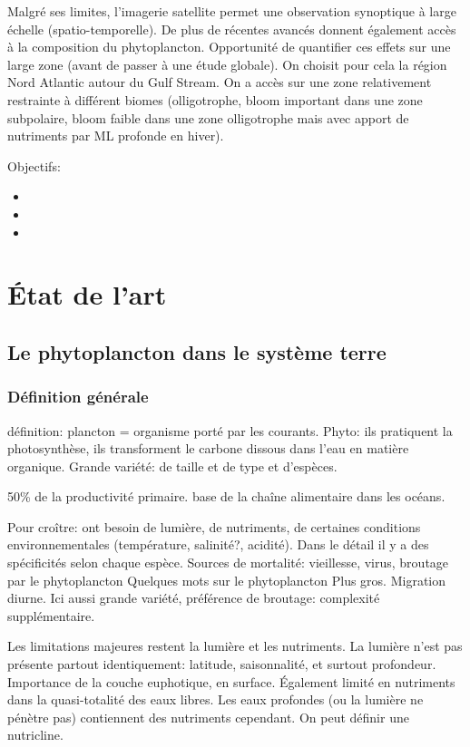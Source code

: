 Malgré ses limites, l'imagerie satellite permet une observation synoptique à large échelle (spatio-temporelle).
De plus de récentes avancés donnent également accès à la composition du phytoplancton.
Opportunité de quantifier ces effets sur une large zone (avant de passer à une étude globale).
On choisit pour cela la région Nord Atlantic autour du Gulf Stream. On a accès sur une zone relativement restrainte à différent biomes (olligotrophe, bloom important dans une zone subpolaire, bloom faible dans une zone olligotrophe mais avec apport de nutriments par ML profonde en hiver).

Objectifs:
\begin{itemize}
  \item
  \item
  \item
\end{itemize}


\section{État de l'art}
\label{sec:etat-de-lart}

\subsection{Le phytoplancton dans le système terre}
\label{sec:phyto-ds-sys-terre}

\subsubsection{Définition générale}
\label{sec:phyto-def-gen}

définition: plancton = organisme porté par les courants.
Phyto: ils pratiquent la photosynthèse, ils transforment le carbone dissous dans l'eau en matière organique.
Grande variété: de taille et de type et d'espèces.

50\% de la productivité primaire.
base de la chaîne alimentaire dans les océans.

Pour croître: ont besoin de lumière, de nutriments, de certaines conditions environnementales (température, salinité?, acidité). Dans le détail il y a des spécificités selon chaque espèce.
Sources de mortalité: vieillesse, virus, broutage par le phytoplancton
Quelques mots sur le phytoplancton Plus gros. Migration diurne. Ici aussi grande variété, préférence de broutage: complexité supplémentaire.

Les limitations majeures restent la lumière et les nutriments.
La lumière n'est pas présente partout identiquement: latitude, saisonnalité, et surtout profondeur. Importance de la couche euphotique, en surface.
Également limité en nutriments dans la quasi-totalité des eaux libres. Les eaux profondes (ou la lumière ne pénètre pas) contiennent des nutriments cependant. On peut définir une nutricline.

